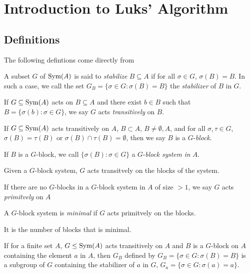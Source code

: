 \section{Introduction to Luks' Algorithm}
\subsection{Definitions}
The following defintions come directly from \cite{luks1982}
\begin{definition}
    A subset $G$ of $\text{Sym}(A)$ is said to \textit{stabilize} $B\subseteq A$ if for all $\sigma\in G$, $\sigma(B)=B$. In such a case, we call the set $G_B=\{\sigma\in G:\sigma(B)=B\}$ the \textit{stabilizer} of $B$ in $G$. 
\end{definition}
\begin{definition}
    If $G\subseteq\text{Sym}(A)$ acts on $B\subseteq A$ and there exist $b\in B$ such that $B=\{\sigma(b):\sigma\in G\}$, we say $G$ acts \textit{transitively} on $B$.
\end{definition}
\begin{definition}
    If $G\subseteq\text{Sym}(A)$ acts transitively on $A$, $B\subset A$, $B\ne\emptyset, A$, and for all $\sigma,\tau\in G$, $\sigma(B)=\tau(B)$ or $\sigma(B)\cap\tau(B)=\emptyset$, then we say $B$ is a $G$-\textit{block}.
\end{definition}
\begin{definition}
    If $B$ is a $G$-block, we call $\{\sigma(B):\sigma\in G\}$ a $G$-\textit{block system in} $A$.
\end{definition}
\begin{remark}
    Given a $G$-block system, $G$ acts transitvely on the blocks of the system.
\end{remark}
\begin{definition}
    If there are no $G$-blocks in a $G$-block system in $A$ of size $>1$, we say $G$ acts \textit{primitvely} on $A$
\end{definition}
\begin{definition}
    A $G$-block system is \textit{minimal} if $G$ acts primitvely on the blocks.
\end{definition}
\begin{remark}
    It is the number of blocks that is minimal.
\end{remark}
\begin{proposition}
    If for a finite set $A$, $G\le\text{Sym}(A)$ acts transitively on $A$ and $B$ is a $G$-block on $A$ containing the element $a$ in $A$, then $G_B$ defined by $G_{B}=\{\sigma\in G:\sigma(B)=B\}$ is a subgroup of $G$ containing the stabilizer of $a$ in $G$, $G_a=\{\sigma\in G:\sigma(a)=a\}$.\cite[117]{dummit2004abstract}
\end{proposition}
